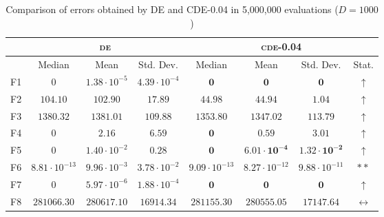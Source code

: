 \begin{table}[!t]
\caption{Comparison of errors obtained by \textsc{DE} and \textsc{CDE}-0.04 in 5,000,000 evaluations ($D = 1000$)}
\label{tab:scalability_1000}
\centering
\begin{scriptsize}
\begin{tabular}{c || c c c | c c c c}
\hline
 & \multicolumn{3}{|c|}{\textsc{de}} & \multicolumn{4}{|c}{\textsc{cde-0.04}} \\ \hline
    & Median                 & Mean                  & Std. Dev.             & Median                         & Mean                           & Std. Dev.                      & Stat.               \\ \hline
F1  & $0$                    & $1.38 \cdot 10^{-5}$  & $4.39 \cdot 10^{-4}$  & $\mathbf{0}$                   & $\mathbf{0}$                   & $\mathbf{0}$                   & $\uparrow$          \\ \hline
F2  & $104.10$               & $102.90$              & $17.89$               & $\mathbf{44.98}$               & $\mathbf{44.94}$               & $\mathbf{1.04}$                & $\uparrow$          \\ \hline
F3  & $1380.32$              & $1381.01$             & $109.88$              & $\mathbf{1353.80}$             & $\mathbf{1347.02}$             & $\mathbf{113.79}$               & $\uparrow$          \\ \hline
F4  & $0$                    & $2.16$                & $6.59$                & $\mathbf{0}$                   & $\mathbf{0.59}$                & $\mathbf{3.01}$                & $\uparrow$          \\ \hline
F5  & $0$                    & $1.40 \cdot 10^{-2}$  & $0.28$                & $\mathbf{0}$                   & $\mathbf{6.01 \cdot 10^{-4}}$  & $\mathbf{1.32 \cdot 10^{-2}}$  & $\uparrow$          \\ \hline
F6  & $8.81 \cdot 10^{-13}$  & $9.96 \cdot 10^{-3}$  & $3.78 \cdot 10^{-2}$  & $9.09 \cdot 10^{-13}$          & $8.27 \cdot 10^{-12}$          & $9.88 \cdot 10^{-11}$          & $**$          \\ \hline
F7  & $0$                    & $5.97 \cdot 10^{-6}$  & $1.88 \cdot 10^{-4}$  & $\mathbf{0}$                   & $\mathbf{0}$                   & $\mathbf{0}$                   & $\uparrow$   \\ \hline
F8  & $281066.30$            & $280617.10$           & $16914.34$            & $281155.30$                    & $280555.05$                    & $17147.64$                     & $\leftrightarrow$   \\ \hline

\end{tabular}
\end{scriptsize}
\end{table}
